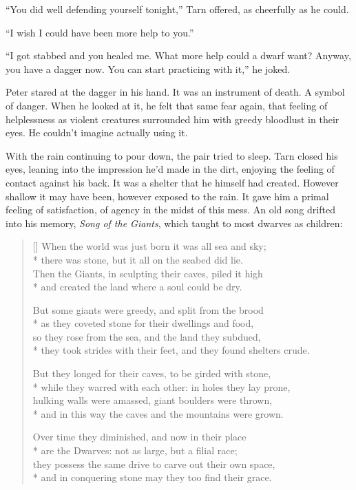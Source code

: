 ``You did well defending yourself tonight,'' Tarn offered, as cheerfully as he could.

``I wish I could have been more help to you.''

``I got stabbed and you healed me.  What more help could a dwarf want?  Anyway, you have a dagger now.  You can start practicing with it,'' he joked.

Peter stared at the dagger in his hand.  It was an instrument of death.  A symbol of danger.  When he looked at it, he felt that same fear again, that feeling of helplessness as violent creatures surrounded him with greedy bloodlust in their eyes.  He couldn't imagine actually using it.

With the rain continuing to pour down, the pair tried to sleep.  Tarn closed his eyes, leaning into the impression he'd made in the dirt, enjoying the feeling of contact against his back.  It was a shelter that he himself had created.  However shallow it may have been, however exposed to the rain.  It gave him a primal feeling of satisfaction, of agency in the midst of this mess.  An old song drifted into his memory, \emph{Song of the Giants}, which taught to most dwarves as children:

\settowidth{\versewidth}{When the world was just born it was all sea and sky;}
\begin{verse}[\versewidth]
When the world was just born it was all sea and sky;\\*
there was stone, but it all on the seabed did lie.\\
Then the Giants, in sculpting their caves, piled it high\\*
and created the land where a soul could be dry.

But some giants were greedy, and split from the brood\\*
as they coveted stone for their dwellings and food,\\
so they rose from the sea, and the land they subdued,\\*
they took strides with their feet, and they found shelters crude.

But they longed for their caves, to be girded with stone,\\*
while they warred with each other: in holes they lay prone,\\
hulking walls were amassed, giant boulders were thrown,\\*
and in this way the caves and the mountains were grown.

Over time they diminished, and now in their place\\*
are the Dwarves: not as large, but a filial race;\\
they possess the same drive to carve out their own space,\\*
and in conquering stone may they too find their grace.
\end{verse}


